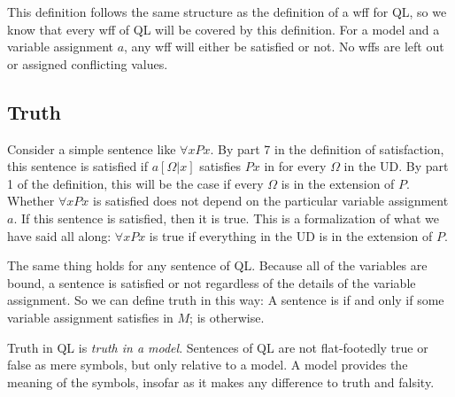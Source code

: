 This definition follows the same structure as the definition of a wff for QL, so we know that every wff of QL will be covered by this definition. For a model  and a variable assignment $a$, any wff will either be satisfied or not. No wffs are left out or assigned conflicting values.




\subsection{Truth}

Consider a simple sentence like $\forall xPx$. By part 7 in the definition of satisfaction, this sentence is satisfied if $a[\Omega|x]$ satisfies $Px$ in  for every $\Omega$ in the UD. By part 1 of the definition, this will be the case if every $\Omega$ is in the extension of $P$. Whether $\forall xPx$ is satisfied does not depend on the particular variable assignment $a$. If this sentence is satisfied, then it is true. This is a formalization of what we have said all along: $\forall xPx$ is true if everything in the UD is in the extension of $P$.

The same thing holds for any sentence of QL. Because all of the variables are bound, a sentence is satisfied or not regardless of the details of the variable assignment. So we can define truth in this way: A sentence  is   if and only if some variable assignment satisfies  in $M$;  is   otherwise.



Truth in QL is \emph{truth in a model}. Sentences of QL are not flat-footedly true or false as mere symbols, but only relative to a model. A model provides the meaning of the symbols, insofar as it makes any difference to truth and falsity.



